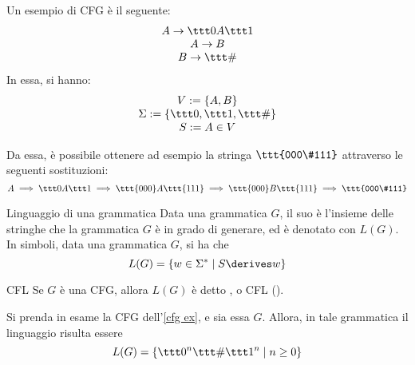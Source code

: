 \documentclass[a4paper, 12pt]{report}
\begin{document}
    \begin{example}[CFG]
        \label{cfg ex}
        Un esempio di CFG è il seguente: $$\left . \begin{array}{c} A \to \ttt 0 A \ttt 1 \\ A \to B \\ B \to \ttt \# \end{array} \right .$$ In essa, si hanno: $$\left . \begin{array}{c} V := \{A, B\} \\ \Sigma := \{\ttt 0, \ttt 1, \ttt \# \} \\ S := A \in V \end{array} \right. $$

        Da essa, è possibile ottenere ad esempio la stringa $\ttt{000\#111}$ attraverso le seguenti sostituzioni: $$A \implies \ttt 0 A \ttt 1 \implies \ttt{000}A\ttt{111} \implies \ttt{000}B\ttt{111} \implies \ttt{000\#111}$$
    \end{example}

    \begin{frameddefn}{Linguaggio di una grammatica}
        Data una grammatica $G$, il suo  è l'insieme delle stringhe che la grammatica $G$ è in grado di generare, ed è denotato con $L(G)$. In simboli, data una grammatica $G$, si ha che $$L(G) = \{w \in \Sigma ^* \mid S \derives w\}$$
    \end{frameddefn}

    \begin{frameddefn}{CFL}
        Se $G$ è una CFG, allora $L(G)$ è detto , o CFL ().
    \end{frameddefn}

    \begin{example}[CFL]
        Si prenda in esame la CFG dell'\cref{cfg ex}, e sia essa $G$. Allora, in tale grammatica il linguaggio risulta essere $$L(G) = \{\ttt 0 ^n \ttt \# \ttt 1 ^n \mid n \ge 0\}$$
    \end{example}
\end{document}
